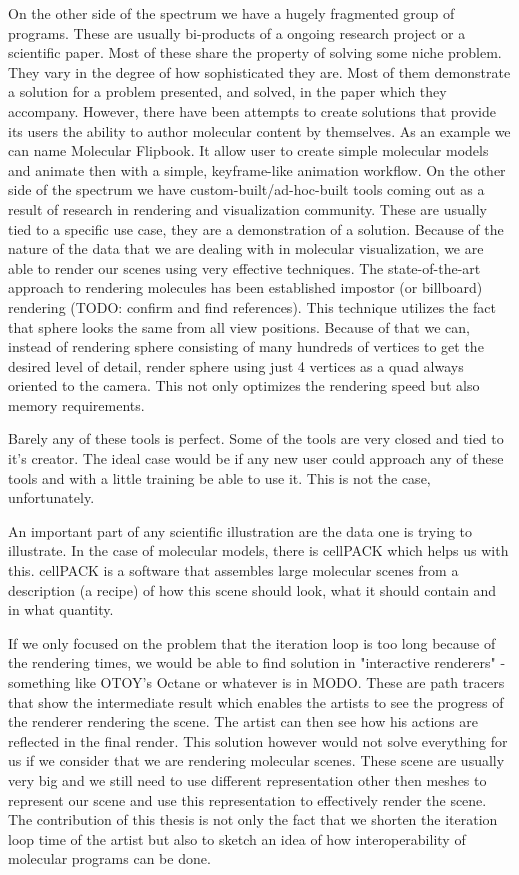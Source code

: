 \documentclass[
  digital, %
  table,   %
  lof,     %
  lot,     %
]{fithesis3}
\begin{document}
On the other side of the spectrum we have a hugely fragmented group of programs. These are usually bi-products of a ongoing research project or a scientific paper. Most of these share the property of solving some niche problem. They vary in the degree of how sophisticated they are. Most of them demonstrate a solution for a problem presented, and solved, in the paper which they accompany. However, there have been attempts to create solutions that provide its users the ability to author molecular content by themselves. As an example we can name Molecular Flipbook. It allow user to create simple molecular models and animate then with a simple, keyframe-like animation workflow.
On the other side of the spectrum we have custom-built/ad-hoc-built tools coming out as a result of research in rendering and visualization community. These are usually tied to a specific use case, they are a demonstration of a solution. Because of the nature of the data that we are dealing with in molecular visualization, we are able to render our scenes using very effective techniques. The state-of-the-art approach to rendering molecules has been established impostor (or billboard) rendering (TODO: confirm and find references). This technique utilizes the fact that sphere looks the same from all view positions. Because of that we can, instead of rendering sphere consisting of many hundreds of vertices to get the desired level of detail, render sphere using just 4 vertices as a quad always oriented to the camera. This not only optimizes the rendering speed but also memory requirements.

Barely any of these tools is perfect. Some of the tools are very closed and tied to it's creator. The ideal case would be if any new user could approach any of these tools and with a little training be able to use it. This is not the case, unfortunately.


An important part of any scientific illustration are the data one is trying to illustrate. In the case of molecular models, there is cellPACK which helps us with this. cellPACK is a software that assembles large molecular scenes from a description (a recipe) of how this scene should look, what it should contain and in what quantity.

If we only focused on the problem that the iteration loop is too long because of the rendering times, we would be able to find solution in "interactive renderers" - something like OTOY's Octane or whatever is in MODO. These are path tracers that show the intermediate result which enables the artists to see the progress of the renderer rendering the scene. The artist can then see how his actions are reflected in the final render. This solution however would not solve everything for us if we consider that we are rendering molecular scenes. These scene are usually very big and we still need to use different representation other then meshes to represent our scene and use this representation to effectively render the scene. The contribution of this thesis is not only the fact that we shorten the iteration loop time of the artist but also to sketch an idea of how interoperability of molecular programs can be done.
\end{document}
